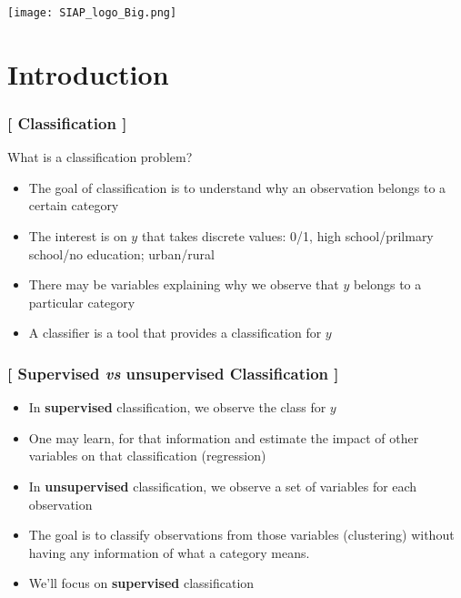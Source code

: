 \documentclass[xcolor=x11names,compress, aspectratio=169]{beamer}
\renewcommand{\(}{\begin{columns}}
\renewcommand{\)}{\end{columns}}
\newcommand{\<}[1]{\begin{column}{#1}}
\renewcommand{\>}{\end{column}}
\begin{document}
\begin{frame}
\Large{ \color{siap}{Machine Learning for Official Statistics and SDGs}}

\hspace{1cm}


\hspace{2cm}
\begin{center}

\texttt{[image: SIAP\_logo\_Big.png]}

\end{center}
\end{frame}



\section{Introduction}

\begin{frame} %

\frametitle{\textcolor{brique}{[ Classification ]}}
What is a classification problem? 
\pause
\begin{itemize}[<+->]
  \item The goal of classification is to understand why an observation belongs to a certain category
  \item The interest is on $y$ that takes discrete values:  0/1, high school/prilmary school/no education; urban/rural
  \item There may be variables explaining why we observe that $y$ belongs to a particular category
  \item A classifier is a tool that  provides a classification for $y$
\end{itemize}
\end{frame}



\begin{frame} %

\frametitle{\textcolor{brique}{[ Supervised \textit{vs} unsupervised Classification ]}}

\pause
\begin{itemize}[<+->]
  \item In \textbf{supervised }classification, we observe the class for  $y$
  \item[] One may learn, for that information and estimate the impact of other variables on that classification (regression)
   \item In \textbf{unsupervised }classification, we observe a set of variables for each observation
  \item[]  The goal is to classify observations from those variables (clustering) without having any information of what a category means. 
  \item We'll focus on \textbf{supervised }classification
\end{itemize}
\end{frame}
\end{document}
